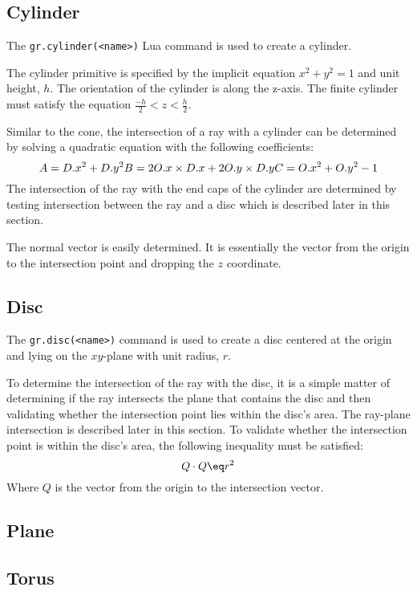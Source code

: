 \subsection*{Cylinder}
The \verb|gr.cylinder(<name>)| Lua command is used to create a cylinder.

The cylinder primitive is specified by the implicit equation $x^2 + y^2 = 1$ and
unit height, $h$. The orientation of the cylinder is along the z-axis. The
finite cylinder must satisfy the equation $\frac{-h}{2} < z < \frac{h}{2}$.

Similar to the cone, the intersection of a ray with a cylinder can be determined
by solving a quadratic equation with the following coefficients:
\begin{equation}
  A = D.x^2 + D.y^2 \\
  B = 2O.x\times D.x + 2O.y\times D.y \\
  C = O.x^2 + O.y^2 - 1
\end{equation}
The intersection of the ray with the end caps of the cylinder are determined by
testing intersection between the ray and a disc which is described later in this
section.

The normal vector is easily determined. It is essentially the vector from the
origin to the intersection point and dropping the $z$ coordinate.

\subsection*{Disc}
The \verb|gr.disc(<name>)| command is used to create a disc centered at the
origin and lying on the $xy$-plane with unit radius, $r$.

To determine the intersection of the ray with the disc, it is a simple matter of
determining if the ray intersects the plane that contains the disc and then
validating whether the intersection point lies within the disc's area. The
ray-plane intersection is described later in this section. To validate whether
the intersection point is within the disc's area, the following inequality must
be satisfied:
\begin{equation}
  Q\cdot Q \eq r^2
\end{equation}
Where $Q$ is the vector from the origin to the intersection vector.

\subsection*{Plane}

\subsection*{Torus}

